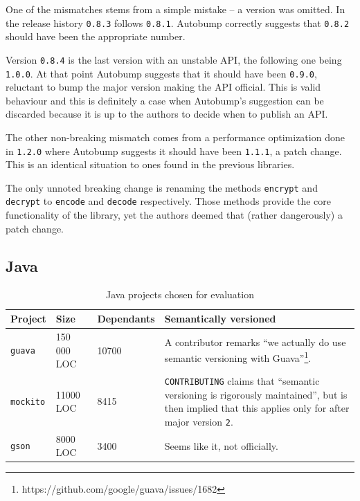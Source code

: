 \documentclass{l4proj}
\newcommand\genericstyle{\lstset{basicstyle=\ttm}}
\newcommand\codeinline[1]{{\genericstyle\lstinline!#1!}}
\begin{document}
One of the mismatches stems from a simple mistake -- a version was
omitted. In the release history \codeinline{0.8.3} follows
\codeinline{0.8.1}. Autobump correctly suggests that
\codeinline{0.8.2} should have been the appropriate number.

Version \codeinline{0.8.4} is the last version with an unstable API,
the following one being \codeinline{1.0.0}. At that point Autobump
suggests that it should have been \codeinline{0.9.0}, reluctant to
bump the major version making the API official. This is valid
behaviour and this is definitely a case when Autobump's suggestion can
be discarded because it is up to the authors to decide when to publish
an API.

The other non-breaking mismatch comes from a performance optimization
done in \codeinline{1.2.0} where Autobump suggests it should have been
\codeinline{1.1.1}, a patch change. This is an identical situation to
ones found in the previous libraries.

The only unnoted breaking change is renaming the methods
\codeinline{encrypt} and \codeinline{decrypt} to \codeinline{encode}
and \codeinline{decode} respectively. Those methods provide the core
functionality of the library, yet the authors deemed that (rather
dangerously) a patch change.

\subsection{Java}

\begin{table}[H]
\centering
\caption{Java projects chosen for evaluation}
\label{JavaProjectsForEvaluation}
\begin{tabular}{|l|l|l|p{10cm}|}
\hline
\textbf{Project} & \textbf{Size} & \textbf{Dependants} & \textbf{Semantically versioned} \\
\hline
\codeinline{guava} & 150 000 LOC & 10700 & A contributor remarks ``we
actually do use semantic versioning with
Guava''\footnote{https://github.com/google/guava/issues/1682}. \\
\codeinline{mockito} & 11000 LOC & 8415 & \codeinline{CONTRIBUTING}
claims that ``semantic versioning is rigorously maintained'', but is
then implied that this applies only for after major version
\codeinline{2}. \\
\codeinline{gson} & 8000 LOC & 3400 & Seems like it, not officially. \\
\hline
\end{tabular}
\end{table}
\end{document}
